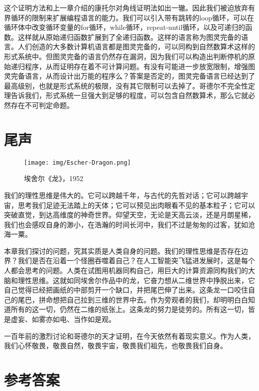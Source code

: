 \documentclass[b5paper]{ctexart}
\begin{document}
这个证明方法和上一章介绍的康托尔对角线证明法如出一辙。因此我们被迫放弃有界循环的限制来扩展编程语言的能力。我们可以引入带有跳转的loop循环，可以在循环体中改变循环变量的for循环，while循环，repeat-until循环，以及可递归的函数。这样就从原始递归函数扩展到了全递归函数。这样的语言称为图灵完备的语言。人们创造的大多数计算机语言都是图灵完备的，可以同构到自然数算术这样的形式系统中。但图灵完备的语言仍然存在漏洞，因为我们可以构造出判断停机的原始递归程序，从而证明存在着不可计算问题。有没有可能进一步放宽限制，增强图灵完备语言，从而设计出万能的程序么？答案是否定的，图灵完备语言已经达到了最高级别，也就是形式系统的极限，没有其它限制可以去掉了。哥德尔不完全性定理告诉我们，形式系统一旦强大到足够的程度，可以包含自然数算术，那么它就必然存在不可判定命题。

\section{尾声}

\begin{figure}[htbp]
 \centering
 \texttt{[image: img/Escher-Dragon.png]}
 \caption{埃舍尔《龙》，1952}
 \label{fig:Escher-Dragon}
\end{figure}

我们的理性思维是伟大的。它可以跨越千年，与古代的先哲对话；它可以跨越宇宙，思考我们足迹无法踏上的天体；它可以预见出肉眼看不见的基本粒子；它可以突破直觉，到达高维度的神奇世界。仰望天空，无论是天高云淡，还是月朗星稀，我们也会感叹自身的渺小，在浩瀚的时间长河中，我们不过是匆匆的过客，犹如沧海一粟。

本章我们探讨的问题，究其实质是人类自身的问题。我们的理性思维是否存在边界？我们是否在沿着一个怪圈吞噬着自己？在人工智能突飞猛进发展时，这是每个人都会思考的问题。人类在试图用机器同构自己，用巨大的计算资源同构我们的大脑和理性思维。这就如同埃舍尔作品中的龙，它奋力想从二维世界中挣脱出来，它自己觉得已经把画纸的中部剪开一个缺口，并把尾巴伸了出来。这条龙一口咬住自己的尾巴，拼命想把自己拉到三维的世界中去。作为旁观者的我们，却明明白白知道所有的这一切，仍然在二维的纸张上。这条龙的努力是徒劳的。所有这一切，皆是虚妄、如雾亦如电、当作如是观。

一百年前的激烈讨论和哥德尔的天才证明，在今天依然有着现实意义。作为人类，我们心怀敬畏，敬畏自然，敬畏宇宙，敬畏我们祖先，也敬畏我们自身。

\ifx\wholebook\relax \else
\section{参考答案}
\shipoutAnswer
\end{document}
